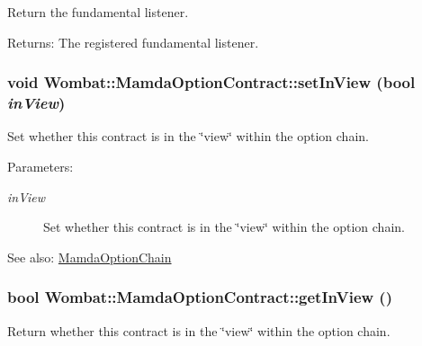 Return the fundamental listener. 

\begin{Desc}
\item[Returns:]The registered fundamental listener. \end{Desc}
\hypertarget{classWombat_1_1MamdaOptionContract_1ce396440ba8edcee5bdb72ba372ba85}{
\subsubsection[setInView]{\setlength{\rightskip}{0pt plus 5cm}void Wombat::Mamda\-Option\-Contract::set\-In\-View (bool {\em in\-View})}}
\label{classWombat_1_1MamdaOptionContract_1ce396440ba8edcee5bdb72ba372ba85}


Set whether this contract is in the \char`\"{}view\char`\"{} within the option chain. 

\begin{Desc}
\item[Parameters:]
\begin{description}
\item[{\em in\-View}]Set whether this contract is in the \char`\"{}view\char`\"{} within the option chain.\end{description}
\end{Desc}
\begin{Desc}
\item[See also:]\hyperlink{classWombat_1_1MamdaOptionChain}{Mamda\-Option\-Chain} \end{Desc}
\hypertarget{classWombat_1_1MamdaOptionContract_b78e238a6970d75cec187b236d693f16}{
\subsubsection[getInView]{\setlength{\rightskip}{0pt plus 5cm}bool Wombat::Mamda\-Option\-Contract::get\-In\-View ()}}
\label{classWombat_1_1MamdaOptionContract_b78e238a6970d75cec187b236d693f16}


Return whether this contract is in the \char`\"{}view\char`\"{} within the option chain. 


